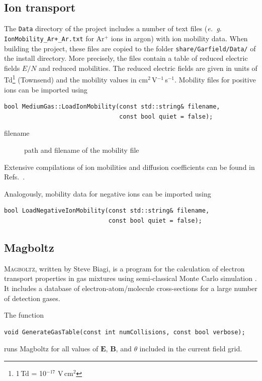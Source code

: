 \subsection{Ion transport}

The \texttt{Data} directory of the project includes a number of text files  
(\textit{e.~g.} \texttt{IonMobility\_Ar+\_Ar.txt} for Ar\(^{+}\) ions in argon) 
with ion mobility data. When building the project, these files are copied to the folder \texttt{share/Garfield/Data/} of the install directory. 
More precisely, the files contain
a table of reduced electric fields \(E/N\) and reduced mobilities.
The reduced electric fields are given in units of   
Td\footnote{1\,Td = 10\(^{-17}\) V\,cm\(^{2}\)} (Townsend) and the mobility values 
in cm\(^{2}\)\,V\(^{-1}\)\,s\(^{-1}\). 
Mobility files for positive ions can be imported using
\begin{lstlisting}
bool MediumGas::LoadIonMobility(const std::string& filename,
                                const bool quiet = false);
\end{lstlisting}
\begin{description}
  \item[filename] path and filename of the mobility file
\end{description}
Extensive compilations of ion mobilities and diffusion coefficients 
can be found in Refs.~\cite{Ellis1976,Ellis1978,Ellis1984,Viehland1995}. 

Analogously, mobility data for negative ions can be imported using
\begin{lstlisting}
bool LoadNegativeIonMobility(const std::string& filename,
                             const bool quiet = false);
\end{lstlisting}

\subsection{Magboltz}

\textsc{Magboltz}, written by Steve Biagi, is a program 
for the calculation of electron transport properties in gas 
mixtures using semi-classical Monte Carlo simulation
\cite{Biagi1999}. 
It includes a database of electron-atom/molecule cross-sections 
for a large number of detection gases. 

The function
\begin{lstlisting}
void GenerateGasTable(const int numCollisions, const bool verbose);
\end{lstlisting}
runs Magboltz for all values of \(\mathbf{E}\), \(\mathbf{B}\), 
and \(\theta\) included in the current field grid. 

